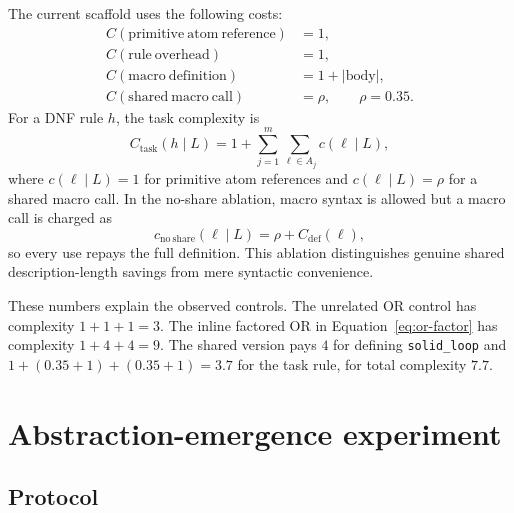 \documentclass[11pt]{article}
\begin{document}
The current scaffold uses the following costs:
\begin{align}
  C(\mathrm{primitive\ atom\ reference}) &= 1,\\
  C(\mathrm{rule\ overhead}) &= 1,\\
  C(\mathrm{macro\ definition}) &= 1+\left|\mathrm{body}\right|,\\
  C(\mathrm{shared\ macro\ call}) &= \rho,\qquad \rho=0.35.
\end{align}
For a DNF rule $h$, the task complexity is
\begin{equation}
  C_{\mathrm{task}}(h\mid L)
  =
  1+
  \sum_{j=1}^{m}\sum_{\ell\in A_j}
  c(\ell\mid L),
  \label{eq:task-complexity}
\end{equation}
where $c(\ell\mid L)=1$ for primitive atom references and $c(\ell\mid L)=\rho$
for a shared macro call. In the no-share ablation, macro syntax is allowed but a
macro call is charged as
\begin{equation}
  c_{\mathrm{no\ share}}(\ell\mid L)=\rho+C_{\mathrm{def}}(\ell),
\end{equation}
so every use repays the full definition. This ablation distinguishes genuine
shared description-length savings from mere syntactic convenience.

These numbers explain the observed controls. The unrelated OR control has
complexity $1+1+1=3$. The inline factored OR in
Equation~\ref{eq:or-factor} has complexity $1+4+4=9$. The shared version pays
$4$ for defining \texttt{solid\_loop} and
$1+(0.35+1)+(0.35+1)=3.7$ for the task rule, for total complexity $7.7$.

\section{Abstraction-emergence experiment}

\subsection{Protocol}
\end{document}
